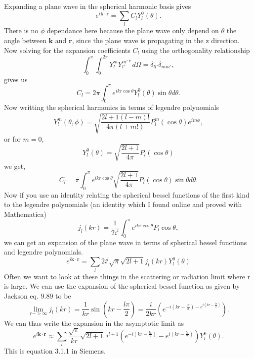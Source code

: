 Expanding a plane wave in the spherical harmonic basis gives
\begin{equation}
   e^{i\mathbf{k}\cdot\mathbf{r}} = \sum\limits_l C_l Y_l^0(\theta).
\end{equation}
There is no $\phi$ dependance here because the plane wave only depend on $\theta$ the angle between $\mathbf{k}$ and $\mathbf{r}$, since the plane wave is propagating in the z direction. Now solving for the expansion coefficients $C_l$ using the orthogonality relationship
\begin{equation}
   \int_0^{\pi} \int_0^{2\pi} Y_l^m Y_{l'}^{m'*} d\Omega = \delta_{ll'}\delta_{mm'},
\end{equation}
gives us
\begin{equation}
   C_l = 2\pi \int_0^{\pi} e^{ikr\cos\theta}Y_l^0(\theta)\sin\theta d\theta.
\end{equation}
Now writting the spherical harmonics in terms of legendre polynomials
\begin{equation}
   Y_l^m(\theta,\phi) = \sqrt{\frac{2l+1(l-m)!}{4\pi(l+m!)}}P_l^m(\cos\theta)e^{im\phi},
\end{equation}
or for $m=0$,
\begin{equation}
   Y_l^0(\theta)=\sqrt{\frac{2l+1}{4\pi}}P_l(\cos\theta)
\end{equation}
we get,
\begin{equation}
   C_l = \pi \int_0^\pi e^{ikr\cos\theta}\sqrt{\frac{2l+1}{4\pi}}P_l(\cos\theta) \sin\theta d\theta.
\end{equation}
Now if you use an identity relating the spherical bessel functions of the first kind to the legendre polynomials (an identity which I found online and proved with Mathematica)
\begin{equation}
   j_l(kr)=\frac{1}{2i^l}\int_0^\pi e^{ikr\cos\theta}P_l{\cos\theta},
\end{equation}
we can get an expansion of the plane wave in terms of spherical bessel functions and legendre polynomials.
\begin{equation}
   \boxed{e^{i\mathbf{k}\cdot\mathbf{r}} = \sum\limits_l 2i^l \sqrt{\pi}\sqrt{2l+1} j_l(kr)Y_l^0(\theta)}
\end{equation}
Often we want to look at these things in the scattering or radiation limit where r is large. We can use the expansion of the spherical bessel function as given by Jackson eq. 9.89 to be
\begin{equation}
   \lim\limits_{r->\infty} j_l(kr) = \frac{1}{kr} \sin\left( kr-\frac{l\pi}{2} \right) = \frac{i}{2kr}(e^{-i(kr-\frac{l\pi}{2}) - e^{i(kr-\frac{l\pi}{2})}}).
\end{equation}
We can thus write the expansion in the asymptotic limit as
\begin{equation}
   \boxed{e^{i\mathbf{k}\cdot\mathbf{r}} \approx \sum\limits_l \frac{\sqrt{\pi}}{kr} \sqrt{2l+1} \, i^{l+1} \left( e^{-i(kr-\frac{l\pi}{2})} - e^{i(kr-\frac{l\pi}{2})} \right) Y_l^0(\theta)}.
\end{equation}
This is equation 3.1.1 in Siemens.
